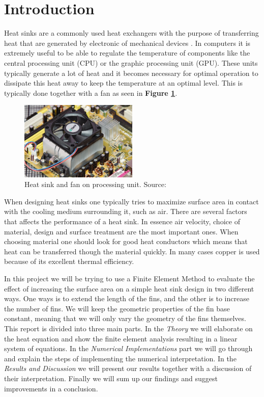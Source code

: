 \section{Introduction}
Heat sinks are a commonly used heat exchangers with the purpose of transferring heat that are generated by electronic of mechanical devices \cite{wiki_hs}. In computers it is extremely useful to be able to regulate the temperature of components like the central processing unit (CPU) or the graphic processing unit	(GPU). These units typically generate a lot of heat and it becomes necessary for optimal operation to dissipate this heat away to keep the temperature at an optimal level. This is typically done together with a fan as seen in \textbf{Figure \ref{fig:heatsink_and_fan}}.

\begin{figure}[h]
    \centering
    \includegraphics[width=0.5\textwidth]{../figures/heatsink_and_fan.jpg}
    \caption{Heat sink and fan on processing unit. Source: \cite{wiki_hs}}
    \label{fig:heatsink_and_fan}
\end{figure}

When designing heat sinks one typically tries to maximize surface area in contact with the cooling medium surrounding it, such as air. There are several factors that affects the performance of a heat sink. In essence air velocity, choice of material, design and surface treatment are the most important ones. When choosing material one should look for good heat conductors which means that heat can be transferred though the material quickly. In many cases copper is used because of its excellent thermal efficiency.

In this project we will be trying to use a Finite Element Method to evaluate the effect of increasing the surface area on a simple heat sink design in two different ways. One ways is to extend the length of the fins, and the other is to increase the number of fins. We will keep the geometric properties of the fin base constant, meaning that we will only vary the geometry of the fins themselves. This report is divided into three main parts. In the \textit{Theory} we will elaborate on the heat equation and show the finite element analysis resulting in a linear system of equations. In the \textit{Numerical Implementations} part we will go through and explain the steps of implementing the numerical interpretation. In the \textit{Results and Discussion} we will present our results together with a discussion of their interpretation. Finally we will sum up our findings and suggest improvements in a conclusion.